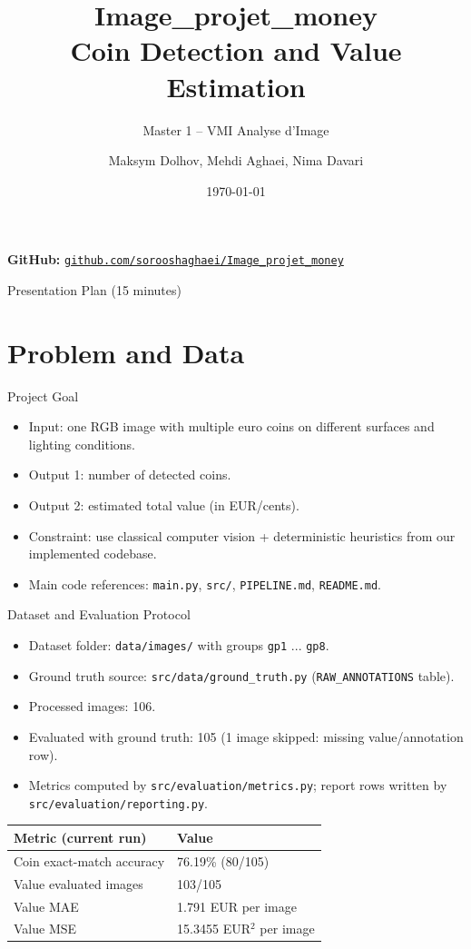 \documentclass[aspectratio=169]{beamer}
\title[Image\_projet\_money]{Image\_projet\_money \\ Coin Detection and Value Estimation}
\subtitle{Master 1 -- VMI Analyse d'Image}
\author{Maksym Dolhov, Mehdi Aghaei, Nima Davari}
\institute{Universite Paris Cite}
\date{\today}
\begin{document}
\begin{frame}
  \titlepage
  \vspace{-0.4em}
  \centering
  \small \textbf{GitHub: }
  \href{https://github.com/sorooshaghaei/Image_projet_money}{\texttt{github.com/sorooshaghaei/Image\_projet\_money}}
\end{frame}

\begin{frame}{Presentation Plan (15 minutes)}
  \tableofcontents
\end{frame}

\section{Problem and Data}

\begin{frame}{Project Goal}
  \begin{itemize}
    \item Input: one RGB image with multiple euro coins on different surfaces and lighting conditions.
    \item Output 1: number of detected coins.
    \item Output 2: estimated total value (in EUR/cents).
    \item Constraint: use classical computer vision + deterministic heuristics from our implemented codebase.
    \item Main code references: \texttt{main.py}, \texttt{src/}, \texttt{PIPELINE.md}, \texttt{README.md}.
  \end{itemize}
\end{frame}

\begin{frame}{Dataset and Evaluation Protocol}
  \begin{itemize}
    \item Dataset folder: \texttt{data/images/} with groups \texttt{gp1} ... \texttt{gp8}.
    \item Ground truth source: \texttt{src/data/ground\_truth.py} (\texttt{RAW\_ANNOTATIONS} table).
    \item Processed images: 106.
    \item Evaluated with ground truth: 105 (1 image skipped: missing value/annotation row).
    \item Metrics computed by \texttt{src/evaluation/metrics.py}; report rows written by \texttt{src/evaluation/reporting.py}.
  \end{itemize}

  \vspace{0.3em}
  \begin{tabular}{@{}ll@{}}
    \toprule
    Metric (current run) & Value \\
    \midrule
    Coin exact-match accuracy & 76.19\% (80/105) \\
    Value evaluated images & 103/105 \\
    Value MAE & 1.791 EUR per image \\
    Value MSE & 15.3455 EUR\(^2\) per image \\
    \bottomrule
  \end{tabular}
\end{frame}
\end{document}
